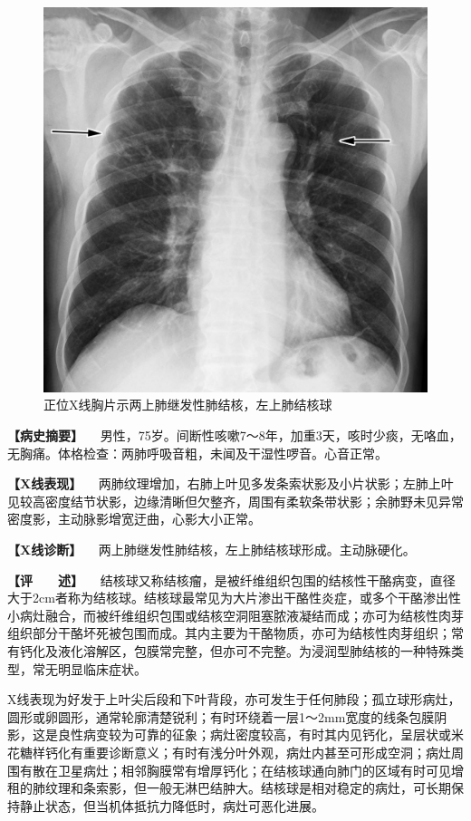 \begin{figure}[!htbp]
 \centering
 \includegraphics{./images/Image00158.jpg}
 \captionsetup{justification=centering}
 \caption{正位X线胸片示两上肺继发性肺结核，左上肺结核球}
 \label{fig3-5-6}
  \end{figure} 

\textbf{【病史摘要】}
　男性，75岁。间断性咳嗽7～8年，加重3天，咳时少痰，无咯血，无胸痛。体格检查：两肺呼吸音粗，未闻及干湿性啰音。心音正常。

\textbf{【X线表现】}
　两肺纹理增加，右肺上叶见多发条索状影及小片状影；左肺上叶见较高密度结节状影，边缘清晰但欠整齐，周围有柔软条带状影；余肺野未见异常密度影，主动脉影增宽迂曲，心影大小正常。

\textbf{【X线诊断】}
　两上肺继发性肺结核，左上肺结核球形成。主动脉硬化。

\textbf{【评　　述】}
　结核球又称结核瘤，是被纤维组织包围的结核性干酪病变，直径大于2cm者称为结核球。结核球最常见为大片渗出干酪性炎症，或多个干酪渗出性小病灶融合，而被纤维组织包围或结核空洞阻塞脓液凝结而成；亦可为结核性肉芽组织部分干酪坏死被包围而成。其内主要为干酪物质，亦可为结核性肉芽组织；常有钙化及液化溶解区，包膜常完整，但亦可不完整。为浸润型肺结核的一种特殊类型，常无明显临床症状。

X线表现为好发于上叶尖后段和下叶背段，亦可发生于任何肺段；孤立球形病灶，圆形或卵圆形，通常轮廓清楚锐利；有时环绕着一层1～2mm宽度的线条包膜阴影，这是良性病变较为可靠的征象；病灶密度较高，有时其内见钙化，呈层状或米花糖样钙化有重要诊断意义；有时有浅分叶外观，病灶内甚至可形成空洞；病灶周围有散在卫星病灶；相邻胸膜常有增厚钙化；在结核球通向肺门的区域有时可见增租的肺纹理和条索影，但一般无淋巴结肿大。结核球是相对稳定的病灶，可长期保持静止状态，但当机体抵抗力降低时，病灶可恶化进展。

